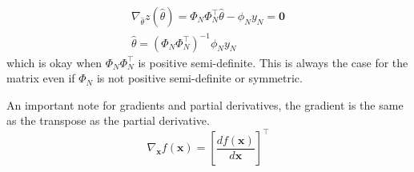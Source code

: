 \documentclass[11pt]{article}
\begin{document}
\begin{gather}
    \nabla_{\hat{\theta}} z(\hat{\theta}) = \Phi_N \Phi_N^\top \hat{\theta} - \phi_N y_N = \textbf{0} \\
    \hat{\theta} = (\Phi_N \Phi_N^\top)^{-1} \phi_N y_N 
\end{gather}
which is okay when $\Phi_N \Phi_N^\top$ is positive semi-definite.
This is always the case for the matrix even if $\Phi_N$ is not positive semi-definite or symmetric.


An important note for gradients and partial derivatives, the gradient is the same as the transpose as the partial derivative.
\begin{equation}
    \nabla_\textbf{x} f(\textbf{x}) = [\frac{d f(\textbf{x})}{d \textbf{x}}]^\top
\end{equation}




\end{document}
